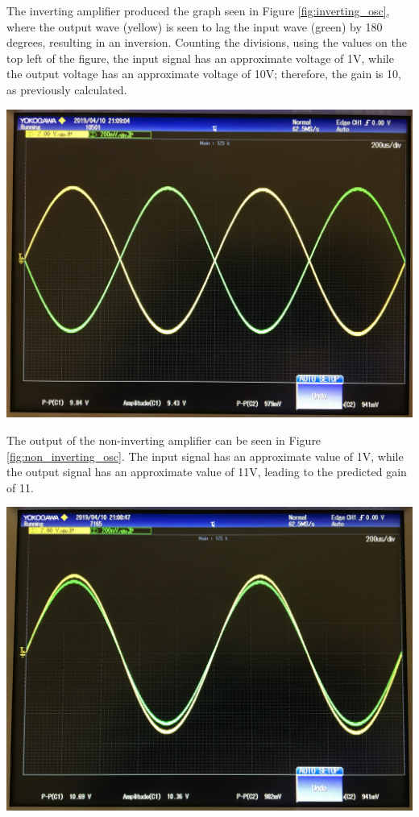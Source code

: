 \documentclass[journal]{IEEEtran}
\begin{document}
\noindent The inverting amplifier produced the graph seen in Figure \ref{fig:inverting_osc}, where the output wave (yellow) is seen to lag the input wave (green) by 180 degrees, resulting in an inversion. Counting the divisions, using the values on the top left of the figure, the input signal has an approximate voltage of 1V, while the output voltage has an approximate voltage of 10V; therefore, the gain is 10, as previously calculated.

\begingroup
    \centering
    \medskip
    \includegraphics[width=\columnwidth]{images/lab7_inverting_osc.jpg}
    \label{fig:inverting_osc}
    \medskip
\endgroup

\noindent The output of the non-inverting amplifier can be seen in Figure \ref{fig:non_inverting_osc}. The input signal has an approximate value of 1V, while the output signal has an approximate value of 11V, leading to the predicted gain of 11. 

\begingroup
    \centering
    \medskip
    \includegraphics[width=\columnwidth]{images/lab7_non_inverting_osc.jpg}
    \label{fig:non_inverting_osc}
    \medskip
\endgroup
\end{document}

